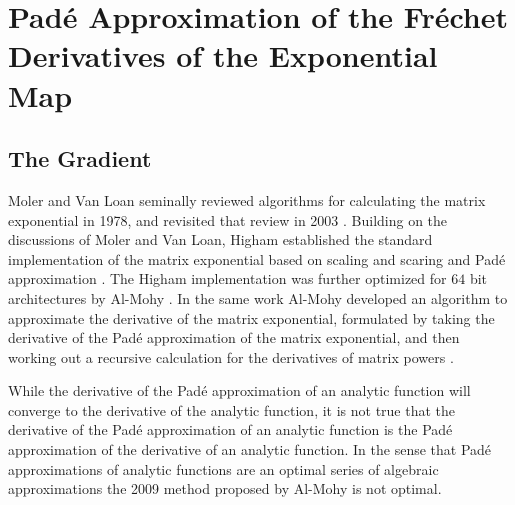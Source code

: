 \chapter{Pad\'{e} Approximation of the Fr\'{e}chet Derivatives of the Exponential Map}
\section{The Gradient}
Moler and Van Loan seminally reviewed algorithms for calculating the matrix exponential in
1978, and revisited that review in 2003 \cite{moler_nineteen_1978,moler_nineteen_2003}. 
Building on the discussions of Moler and Van Loan, Higham established the standard 
implementation of the matrix exponential based on scaling and scaring and Pad\'{e} 
approximation \cite{higham_scaling_2005,higham_functions_2008}. The Higham implementation was
further optimized for $64$ bit architectures by Al-Mohy \cite{al-mohy_new_2009}. In the same
work Al-Mohy developed an algorithm to approximate the derivative of the matrix exponential, 
formulated by taking the derivative of the Pad\'{e} approximation of the matrix exponential, 
and then working out a recursive calculation for the derivatives of matrix 
powers \cite{al-mohy_computing_2009}.

While the derivative of the Pad\'{e} approximation of an analytic function will converge to 
the derivative of the analytic function, it is not true that the derivative of the Pad\'{e} 
approximation of an analytic function is the Pad\'{e} approximation of the derivative of an 
analytic function. In the sense that Pad\'{e} approximations of analytic functions are an 
optimal series of algebraic approximations the 2009 method proposed by Al-Mohy is not 
optimal.

